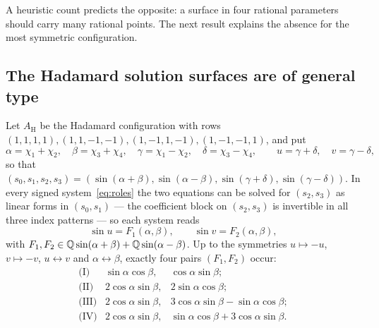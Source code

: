 A heuristic count predicts the opposite: a surface in four rational parameters should carry many rational points. The
next result explains the absence for the most symmetric configuration.

\subsection{The Hadamard solution surfaces are of general type}

Let $A_{\mathrm H}$ be the Hadamard configuration with rows $(1,1,1,1),(1,1,-1,-1),(1,-1,1,-1),(1,-1,-1,1)$, and put
\[
\alpha=\chi_1+\chi_2,\quad \beta=\chi_3+\chi_4,\quad \gamma=\chi_1-\chi_2,\quad \delta=\chi_3-\chi_4,\qquad
u=\gamma+\delta,\quad v=\gamma-\delta,
\]
so that $(s_0,s_1,s_2,s_3)=(\sin(\alpha+\beta),\sin(\alpha-\beta),\sin(\gamma+\delta),\sin(\gamma-\delta))$. In every signed
system~\eqref{eq:roles} the two equations can be solved for $(s_2,s_3)$ as linear forms in $(s_0,s_1)$ — the coefficient
block on $(s_2,s_3)$ is invertible in all three index patterns — so each system reads
\begin{equation}\label{eq:bidouble}
\sin u=F_1(\alpha,\beta),\qquad \sin v=F_2(\alpha,\beta),
\end{equation}
with $F_1,F_2\in\mathbb Q\sin(\alpha+\beta)+\mathbb Q\sin(\alpha-\beta)$. Up to the symmetries $u\mapsto-u$, $v\mapsto-v$,
$u\leftrightarrow v$ and $\alpha\leftrightarrow\beta$, exactly four pairs $(F_1,F_2)$ occur:
\[
\begin{array}{cll}
\text{(I)} & \sin\alpha\cos\beta, & \cos\alpha\sin\beta;\\
\text{(II)} & 2\cos\alpha\sin\beta, & 2\sin\alpha\cos\beta;\\
\text{(III)} & 2\cos\alpha\sin\beta, & 3\cos\alpha\sin\beta-\sin\alpha\cos\beta;\\
\text{(IV)} & 2\cos\alpha\sin\beta, & \sin\alpha\cos\beta+3\cos\alpha\sin\beta .
\end{array}
\]

